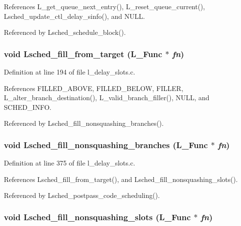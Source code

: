 References L\_\-get\_\-queue\_\-next\_\-entry(), L\_\-reset\_\-queue\_\-current(), Lsched\_\-update\_\-ctl\_\-delay\_\-sinfo(), and NULL.

Referenced by Lsched\_\-schedule\_\-block().
\subsubsection{\setlength{\rightskip}{0pt plus 5cm}void Lsched\_\-fill\_\-from\_\-target (L\_\-Func $\ast$ {\em fn})}\label{l__delay__slots_8c_44e02966abab06e75570cb8888121db8}




Definition at line 194 of file l\_\-delay\_\-slots.c.

References FILLED\_\-ABOVE, FILLED\_\-BELOW, FILLER, L\_\-alter\_\-branch\_\-destination(), L\_\-valid\_\-branch\_\-filler(), NULL, and SCHED\_\-INFO.

Referenced by Lsched\_\-fill\_\-nonsquashing\_\-branches().
\subsubsection{\setlength{\rightskip}{0pt plus 5cm}void Lsched\_\-fill\_\-nonsquashing\_\-branches (L\_\-Func $\ast$ {\em fn})}\label{l__delay__slots_8c_64e73713da82b24bb5934505eeb64c45}




Definition at line 375 of file l\_\-delay\_\-slots.c.

References Lsched\_\-fill\_\-from\_\-target(), and Lsched\_\-fill\_\-nonsquashing\_\-slots().

Referenced by Lsched\_\-postpass\_\-code\_\-scheduling().
\subsubsection{\setlength{\rightskip}{0pt plus 5cm}void Lsched\_\-fill\_\-nonsquashing\_\-slots (L\_\-Func $\ast$ {\em fn})}\label{l__delay__slots_8c_b61e607fcd85186dbba09d495c658696}




